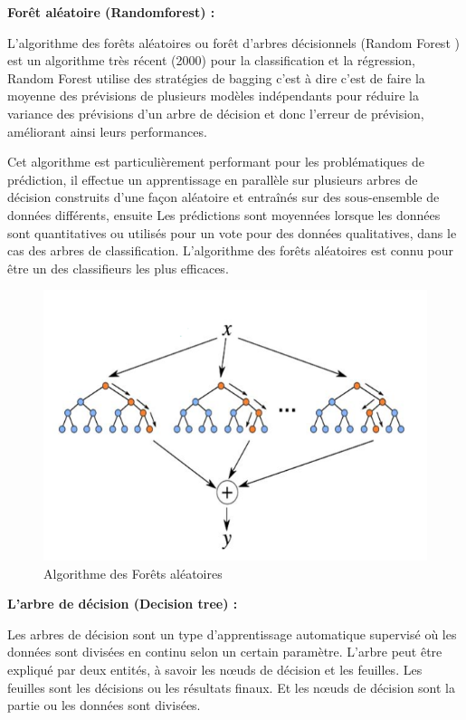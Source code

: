    	
\textbf{Forêt aléatoire (Randomforest) :}

L’algorithme des forêts aléatoires ou forêt d’arbres décisionnels (Random Forest ) est un algorithme très récent (2000) pour la  classification et la régression, Random Forest utilise des stratégies de bagging c'est à dire c’est de faire la moyenne des prévisions de plusieurs modèles indépendants pour réduire la variance des prévisions d'un arbre de décision et donc l’erreur de prévision, améliorant ainsi leurs performances.

Cet algorithme est particulièrement performant pour les problématiques de prédiction, il effectue un apprentissage en parallèle sur plusieurs arbres de décision construits d'une façon aléatoire et entraînés sur des sous-ensemble de données différents, ensuite Les prédictions sont moyennées lorsque les données sont quantitatives ou utilisés pour un vote pour des données qualitatives, dans le cas des arbres de classification. L’algorithme des forêts aléatoires est connu pour être un des classifieurs les plus efficaces\cite{RF}.


\begin{figure}[H]
\begin{center}
\includegraphics[width=0.8\linewidth]{images/randomforest.png}
\end{center}
\caption{Algorithme des Forêts aléatoires}
\label{fig:7}
\end{figure}

\textbf{L'arbre de décision (Decision tree) : }

Les arbres de décision sont un type d'apprentissage automatique supervisé où les données sont divisées en continu selon un certain paramètre. L'arbre peut être expliqué par deux entités, à savoir les nœuds de décision et les feuilles. Les feuilles sont les décisions ou les résultats finaux. Et les nœuds de décision sont la partie ou les données sont divisées.

